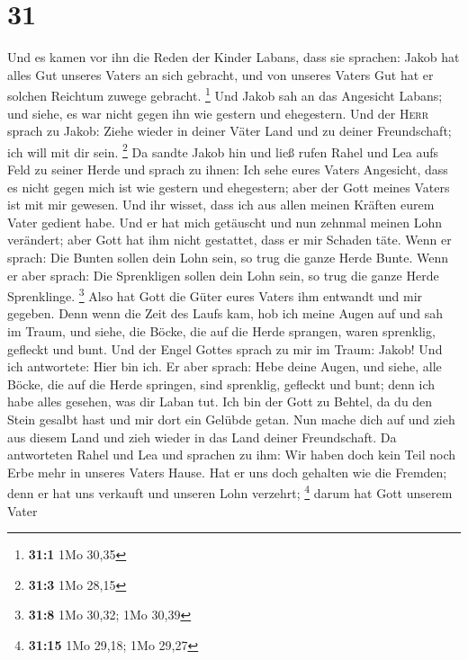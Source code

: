 \hypertarget{section-6}{%
\section{31}\label{section-6}}

 Und es kamen vor ihn die Reden der Kinder Labans, dass
sie sprachen: Jakob hat alles Gut unseres Vaters an sich gebracht, und
von unseres Vaters Gut hat er solchen Reichtum zuwege gebracht.
\footnote{\textbf{31:1} 1Mo 30,35}  Und Jakob sah an das
Angesicht Labans; und siehe, es war nicht gegen ihn wie gestern und
ehegestern.  Und der \textsc{Herr} sprach zu Jakob: Ziehe
wieder in deiner Väter Land und zu deiner Freundschaft; ich will mit dir
sein. \footnote{\textbf{31:3} 1Mo 28,15}  Da sandte Jakob
hin und ließ rufen Rahel und Lea aufs Feld zu seiner Herde
 und sprach zu ihnen: Ich sehe eures Vaters Angesicht,
dass es nicht gegen mich ist wie gestern und ehegestern; aber der Gott
meines Vaters ist mit mir gewesen.  Und ihr wisset, dass
ich aus allen meinen Kräften eurem Vater gedient habe. 
Und er hat mich getäuscht und nun zehnmal meinen Lohn verändert; aber
Gott hat ihm nicht gestattet, dass er mir Schaden täte. 
Wenn er sprach: Die Bunten sollen dein Lohn sein, so trug die ganze
Herde Bunte. Wenn er aber sprach: Die Sprenkligen sollen dein Lohn sein,
so trug die ganze Herde Sprenklinge. \footnote{\textbf{31:8} 1Mo 30,32;
  1Mo 30,39}  Also hat Gott die Güter eures Vaters ihm
entwandt und mir gegeben.  Denn wenn die Zeit des Laufs
kam, hob ich meine Augen auf und sah im Traum, und siehe, die Böcke, die
auf die Herde sprangen, waren sprenklig, gefleckt und bunt.
 Und der Engel Gottes sprach zu mir im Traum: Jakob! Und
ich antwortete: Hier bin ich.  Er aber sprach: Hebe deine
Augen, und siehe, alle Böcke, die auf die Herde springen, sind
sprenklig, gefleckt und bunt; denn ich habe alles gesehen, was dir Laban
tut.  Ich bin der Gott zu Behtel, da du den Stein gesalbt
hast und mir dort ein Gelübde getan. Nun mache dich auf und zieh aus
diesem Land und zieh wieder in das Land deiner Freundschaft.
 Da antworteten Rahel und Lea und sprachen zu ihm: Wir
haben doch kein Teil noch Erbe mehr in unseres Vaters Hause.
 Hat er uns doch gehalten wie die Fremden; denn er hat
uns verkauft und unseren Lohn verzehrt; \footnote{\textbf{31:15} 1Mo
  29,18; 1Mo 29,27}  darum hat Gott unserem Vater
